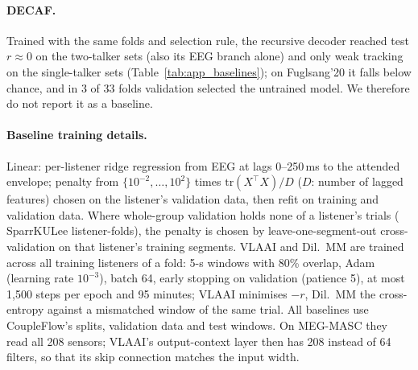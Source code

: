 \documentclass[twoside]{article}
\begin{document}
\paragraph{DECAF.} Trained with the same folds and selection rule, the recursive decoder
reached test $r\approx0$ on the two-talker sets (also its EEG branch alone) and only weak
tracking on the single-talker sets (Table~\ref{tab:app_baselines}); on Fuglsang'20 it falls
below chance, and in 3 of 33 folds validation selected the untrained model. We therefore do
not report it as a baseline.

\paragraph{Baseline training details.} Linear: per-listener ridge regression from EEG at lags
0--250\,ms to the attended envelope; penalty from $\{10^{-2},\dots,10^{2}\}$ times
$\mathrm{tr}(X^\top X)/D$ ($D$: number of lagged features) chosen on the listener's validation
data, then refit on training and validation data. Where whole-group validation holds none of a
listener's trials (\linInnerCV{} SparrKULee listener-folds), the penalty is chosen by
leave-one-segment-out cross-validation on that listener's training segments. VLAAI and Dil.\ MM are trained across all training listeners of a fold:
5-s windows with 80\% overlap, Adam (learning rate $10^{-3}$), batch 64, early stopping on
validation (patience 5), at most 1{,}500 steps per epoch and 95 minutes; VLAAI minimises
$-r$, Dil.\ MM the cross-entropy against a mismatched window of the same trial. All baselines use CoupleFlow's splits, validation data and test windows. On MEG-MASC they
read all 208 sensors; VLAAI's output-context layer then has 208 instead of 64 filters, so that
its skip connection matches the input width.
\end{document}
